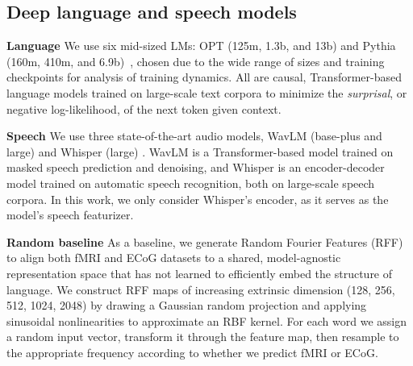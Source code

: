 \documentclass{article}
\theoremstyle{plain}
\theoremstyle{definition}
\theoremstyle{remark}
\newcommand{\mypar}[1]{\textbf{#1}\quad}
\begin{document}
\subsection{Deep language and speech models}
\textbf{Language} \quad We use six mid-sized LMs: OPT (125m, 1.3b, and 13b) \citep{zhang2022opt} and Pythia (160m, 410m, and 6.9b)~\citep{biderman2023pythia}, chosen due to the wide range of sizes and training checkpoints for analysis of training dynamics. All are causal, Transformer-based language models trained on large-scale text corpora to minimize the \emph{surprisal}, or negative log-likelihood, of the next token given context. 

\textbf{Speech} \quad We use three state-of-the-art audio models, WavLM (base-plus and large) \citep{chen2022wavlm} and Whisper (large) \citep{whisper}. WavLM is a Transformer-based model trained on masked speech prediction and denoising, and Whisper is an encoder-decoder model trained on automatic speech recognition, both on large-scale speech corpora. In this work, we only consider Whisper's encoder, as it serves as the model's speech featurizer. 

\mypar{Random baseline} As a baseline, we generate Random Fourier Features (RFF) \citep{Rahimi_Recht_2007} to align both fMRI and ECoG datasets to a shared, model-agnostic representation space that has not learned to efficiently embed the structure of language. We construct RFF maps of increasing extrinsic dimension (128, 256, 512, 1024, 2048) by drawing a Gaussian random projection and applying sinusoidal nonlinearities to approximate an RBF kernel. For each word we assign a random input vector, transform it through the feature map, then resample to the appropriate frequency according to whether we predict fMRI or ECoG.
\end{document}
